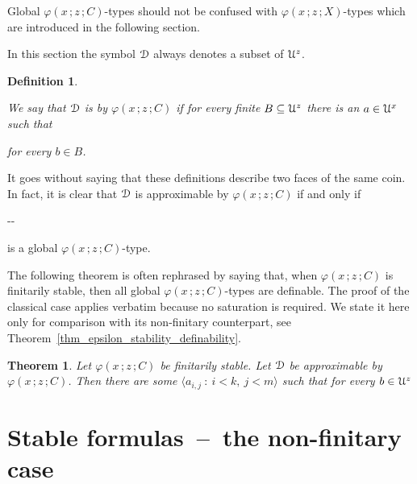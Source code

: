 \documentclass{amsproc}
\newcounter{thm}
\theoremstyle{mio}
\newtheorem{theorem}[thm]{Theorem}\tcolorboxenvironment{theorem}{mythm}
\newtheorem{definition}[thm]{Definition}\tcolorboxenvironment{definition}{mythm}
\renewcommand*{\emph}[1]{%
   \smash{\tikz[baseline]\node[rectangle, fill=teal!25, rounded corners, inner xsep=0.5ex, inner ysep=0.2ex, anchor=base, minimum height = 2.7ex]{\strut #1};}}
\begin{document}
Global $\varphi(x\,;z\,;C)$-types should not be confused with $\varphi(x\,;z\,;X)$-types which are introduced in the following section.

In this section the symbol ${\EuScript D}$ always denotes a subset of ${\EuScript U}^z$.

\begin{definition}\label{def_approx}\strut
  We say that ${\EuScript D}$ is \emph{approximable\/} by $\varphi(x\,;z\,;C)$ if for every finite $B\subseteq {\EuScript U}^z$ there is an $a\in {\EuScript U}^x$ such that\smallskip

  \hfill for every $b\in B$.
\end{definition}

It goes without saying that these definitions describe two faces of the same coin.
In fact, it is clear that ${\EuScript D}$ is approximable by $\varphi(x\,;z\,;C)$ if and only if  
    
  \noindent\kern-\kern-

is a global $\varphi(x\,;z\,;C)$-type.\smallskip

The following theorem is often rephrased by saying that, when $\varphi(x\,;z\,;C)$ is finitarily stable, then all global $\varphi(x\,;z\,;C)$-types are definable.
The proof of the classical case applies verbatim because no saturation is required.
We state it here only for comparison with its non-finitary counterpart, see Theorem~\ref{thm_epsilon_stability_definability}.

\begin{theorem}
  Let $\varphi(x\,;z\,;C)$ be finitarily stable.
  Let ${\EuScript D}$ be approximable by $\varphi(x\,;z\,;C)$.
  Then there are some $\langle a_{i,j}\ :\ i< k,\ j<m\rangle$ such that for every $b\in{\EuScript U}^z$\medskip

\end{theorem}


\section{Stable formulas~--~the non-finitary case}
\def\medrel#1{\parbox{5ex}{\hfil $#1$}}
\def\ceq#1#2#3{\parbox[t]{22ex}{$\displaystyle #1$}\medrel{#2}{$\displaystyle #3$}}
\end{document}

